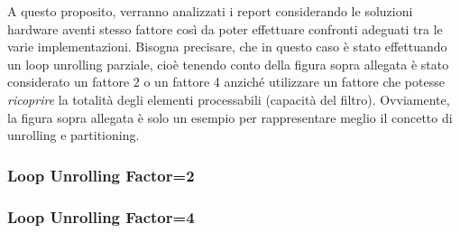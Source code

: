 A questo proposito, verranno analizzati i report considerando le soluzioni hardware aventi stesso fattore così da poter effettuare confronti adeguati tra le varie implementazioni. Bisogna precisare, che in questo caso è stato effettuando un loop unrolling parziale, cioè tenendo conto della figura sopra allegata è stato considerato un fattore 2 o un fattore 4 anziché utilizzare un fattore che potesse \textit{ricoprire} la totalità degli elementi processabili (capacità del filtro). Ovviamente, la figura sopra allegata è solo un esempio per rappresentare meglio il concetto di unrolling e partitioning.

\subsubsection{Loop Unrolling Factor=2}


\newpage

\subsubsection{Loop Unrolling Factor=4}


